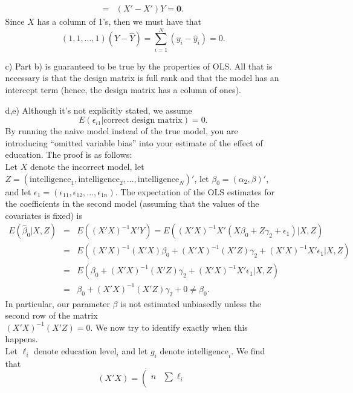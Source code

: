 \documentclass{article}
\begin{document}
\begin{itemize}
\begin{itemize}
\begin{align*}
        = & (X' - X')Y = \mathbf 0.
      \end{align*}
      Since $X$ has a column of 1's, then we must have that
      \begin{equation*}
        (1, 1, \ldots, 1)(Y - \hat Y) = \sum_{i=1}^N (y_i - \hat y_i) = 0.
      \end{equation*}
    \item[c)]
      Part b) is guaranteed to be true by the properties of OLS.
      All that is necessary is that the design matrix is full rank 
      and that the model has an intercept term (hence, the design matrix has a column of ones).
    \item[d,e)]
      Although it's not explicitly stated, we assume
      $$
        E(\epsilon_{i1}| \text{correct design matrix}) = 0.
      $$
      By running the naive model instead of the true model, 
      you are introducing ``omitted variable bias'' into your 
      estimate of the effect of education. 
      The proof is as follows: \\[1ex]
      Let $X$ denote the incorrect model, 
      let $Z = (\text{intelligence}_1,  \text{intelligence}_2,\ldots, \text{intelligence}_N)'$,
      let $\beta_0 = (\alpha_2,\beta)'$, and let $\epsilon_1 = (\epsilon_{11},\epsilon_{12}, \ldots, \epsilon_{1n})$.
      The expectation of the OLS estimates for the coefficients in the second model 
      (assuming that the values of the covariates is fixed) is 
      \begin{eqnarray*}
        E(\hat \beta_0|X,Z) &=& E((X'X)^{-1}X'Y) = E((X'X)^{-1}X'(X\beta_0 + Z\gamma_2 + \epsilon_{1})|X,Z)\\
        &=& E((X'X)^{-1}(X'X)\beta_0 + (X'X)^{-1}(X'Z)\gamma_2 + (X'X)^{-1}X'\epsilon_{1}|X,Z)\\
        & = & E(\beta_0 +  (X'X)^{-1}(X'Z)\gamma_2 + (X'X)^{-1}X'\epsilon_{1}|X,Z) \\
        & = & \beta_0 + (X'X)^{-1}(X'Z)\gamma_2 + 0 \neq \beta_0.
      \end{eqnarray*}
      In particular, our parameter $\beta$ is not estimated 
      unbiasedly unless the second row of the matrix\\
      $(X'X)^{-1}(X'Z) = 0$.  
      We now try to identify exactly when this happens. \\
      Let $\ell_i$ denote $\text{education level}_i$ and let
      $g_i$ denote $\text{intelligence}_i$.
      We find that 
      $$
        (X'X) = \left(
          \begin{array}{cc}
            n & \sum \ell_i\\

\end{array}$$
\end{itemize}
\end{itemize}
\end{document}

